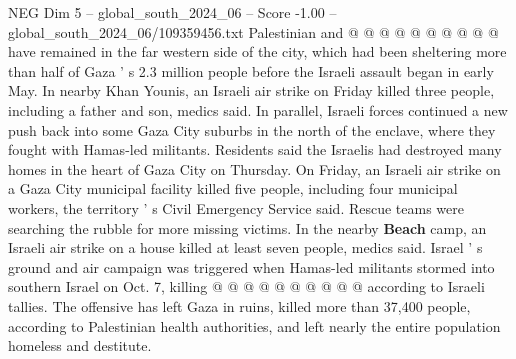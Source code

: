 \begin{textsample}{NEG Dim 5 – global\_south\_2024\_06 – Score -1.00 – global\_south\_2024\_06/109359456.txt}
Palestinian and @ @ @ @ @ @ @ @ @ @ have remained in the far western side of the city, which had been sheltering more than half of Gaza ' s 2.3 million people before the Israeli assault began in early May.
In nearby Khan Younis, an Israeli air strike on Friday killed three people, including a father and son, medics said.
In parallel, Israeli forces continued a new push back into some Gaza City suburbs in the north of the enclave, where they fought with Hamas-led militants.
Residents said the Israelis had destroyed many homes in the heart of Gaza City on Thursday.
On Friday, an Israeli air strike on a Gaza City municipal facility killed five people, including four municipal workers, the territory ' s Civil Emergency Service said.
Rescue teams were searching the rubble for more missing victims.
In the nearby \textbf{Beach} camp, an Israeli air strike on a house killed at least seven people, medics said.
Israel ' s ground and air campaign was triggered when Hamas-led militants stormed into southern Israel on Oct. 7, killing @ @ @ @ @ @ @ @ @ @ according to Israeli tallies.
The offensive has left Gaza in ruins, killed more than 37,400 people, according to Palestinian health authorities, and left nearly the entire population homeless and destitute.

\end{textsample}
